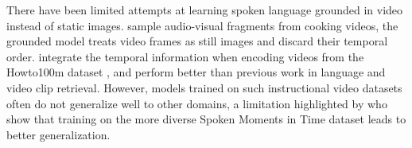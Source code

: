 There have been limited attempts at learning spoken language grounded in video instead of static images. 
\citet{boggust2019grounding} sample audio-visual fragments from cooking videos, the grounded model treats video frames as still images and discard their temporal order.
\citet{rouditchenko2020avlnet} integrate the temporal information when encoding videos from the Howto100m dataset \cite{miech2019howto100m}, and perform better than previous work in language and video clip retrieval. 
However, models trained on such instructional video datasets often do not generalize well to other domains, a limitation highlighted by \citet{} who show that training on the more diverse Spoken Moments in Time dataset \cite{monfort2021spokenmoments} leads to better generalization. 

 





